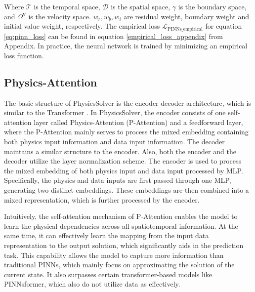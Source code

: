 \documentclass[preprint,11pt]{elsarticle}
\newcommand{\bv}{\boldsymbol{v}}
\begin{document}
Where $\mathcal{T}$ is the temporal space, $\mathcal{D}$ is the spatial space, $\mathcal{\gamma}$ is the boundary space, and $\Omega^{\bv}$ is the velocity space. $w_{r}, w_{b}, w_{i}$ are residual weight, boundary weight and initial value weight, respectively. The empirical loss $\mathcal{L}_\text{PINNs\_empirical}$ for equation \eqref{eq:pinn_loss} can be found in equation \eqref{empirical_loss_appendix} from Appendix. In practice, the neural network is trained by minimizing an empirical loss function.

\subsection{Physics-Attention}
The basic structure of PhysicsSolver is the encoder-decoder architecture, which is similar to the Transformer \cite{vaswani2017attention}. In PhysicsSolver, the encoder consists of one self-attention layer called Physics-Attention (P-Attention) and a feedforward layer, where the P-Attention mainly serves to process the mixed embedding containing both physics input information and data input information. The decoder maintains a similar structure to the encoder. Also, both the encoder and the decoder utilize the layer normalization scheme. The encoder is used to process the mixed embedding of both physics input and data input processed by MLP. Specifically, the physics and data inputs are first passed through one MLP, generating two distinct embeddings. These embeddings are then combined into a mixed representation, which is further processed by the encoder. 


Intuitively, the self-attention mechanism of P-Attention enables the model to learn the physical dependencies across all spatiotemporal information. At the same time, it can effectively learn the mapping from the input data representation to the output solution, which significantly aids in the prediction task. This capability allows the model to capture more information than traditional PINNs, which mainly focus on approximating the solution of the current state. It also surpasses certain transformer-based models like PINNsformer, which also do not utilize data as effectively.
\end{document}
